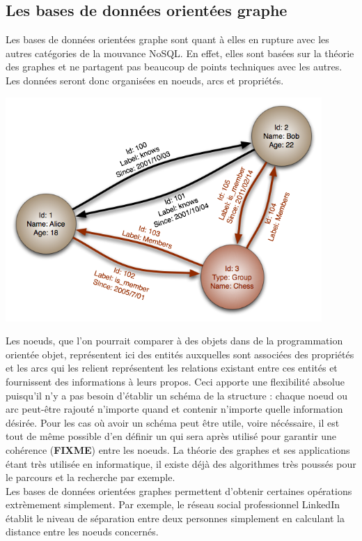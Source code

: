 \documentclass[11pt]{article}
\begin{document}
\subsection{Les bases de données orientées graphe}
Les bases de données orientées graphe sont quant à elles en rupture avec les autres catégories de la mouvance NoSQL. En effet, elles sont basées sur la théorie des graphes et ne partagent pas beaucoup de points techniques avec les autres. Les données seront donc organisées en noeuds, arcs et propriétés. \\
\begin{center}
  \includegraphics[width=12cm]{nosql_graph.png}
\end{center}
Les noeuds, que l'on pourrait comparer à des objets dans de la programmation orientée objet, représentent ici des entités auxquelles sont associées des propriétés et les arcs qui les relient représentent les relations existant entre ces entités et fournissent des informations à leurs propos. Ceci apporte une flexibilité absolue puisqu'il n'y a pas besoin d'établir un schéma de la structure : chaque noeud ou arc peut-être rajouté n'importe quand et contenir n'importe quelle information désirée. Pour les cas où avoir un schéma peut être utile, voire nécéssaire, il est tout de même possible d'en définir un qui sera après utilisé pour garantir une cohérence (\colorbox{BrickRed}{\textbf{FIXME}}) entre les noeuds. La théorie des graphes et ses applications étant très utilisée en informatique, il existe déjà des algorithmes très poussés pour le parcours et la recherche par exemple. \\
Les bases de données orientées graphes permettent d'obtenir certaines opérations extrèmement simplement. Par exemple, le réseau social professionnel LinkedIn établit le niveau de séparation entre deux personnes simplement en calculant la distance entre les noeuds concernés.
\end{document}
